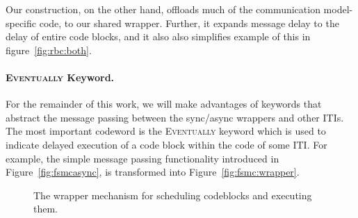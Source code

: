 Our construction, on the other hand, offloads much of the communication model-specific code, to our shared wrapper.
Further, it expands message delay to the delay of entire code blocks, and it also also simplifies
example of this in figure~\ref{fig:rbc:both}.


\paragraph{\textsc{Eventually} Keyword.}
For the remainder of this work, we will make advantages of keywords that abstract the message passing between the sync/async wrappers and other ITIs.
The most important codeword is the \textsc{Eventually} keyword which is used to indicate delayed execution of a code block within the code of some ITI.
For example, the simple message passing functionality introduced in Figure~\ref{fig:fsmcasync}, is transformed into Figure~\ref{fig:fsmc:wrapper}.

\begin{figure}

\caption{The wrapper mechanism for scheduling codeblocks and executing them.}
\label{fig:asyncwrapper:short}
\end{figure}
